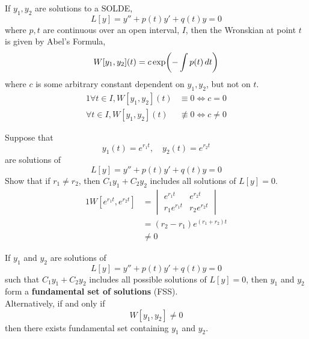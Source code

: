 \documentclass[diffeq.tex]{subfiles}
\begin{document}
    \begin{btheorem}
        If $y_{1}, y_{2}$ are solutions to a SOLDE,
        \begin{equation}
            L[y] = y'' + p(t)y' + q(t)y = 0
        \end{equation}
        where $p, t$ are continuous over an open interval, $I$, then the Wronskian at point $t$ is given by Abel's Formula,
        \begin{equation}
            W[y_{1}, y_{2}](t) = c\exp\bbbp{-\int p(t)\,dt}
        \end{equation}
        where $c$ is some arbitrary constant dependent on $y_{1}, y_{2}$, but not on $t$.
        \begin{alignat}{1}
            \forall t\in I, W[y_{1}, y_{2}](t) &\equiv 0 \iff c = 0\\
            \forall t\in I, W[y_{1}, y_{2}](t) &\nequiv 0 \iff c \neq 0
        \end{alignat}
    \end{btheorem}
    \np
    \begin{example}
        Suppose that
        \begin{equation}
            y_{1}(t) = e^{r_{1}t},\quad y_{2}(t) = e^{r_{2}t}
        \end{equation}
        are solutions of
        \begin{equation}
            L[y] = y'' + p(t)y' + q(t)y = 0
        \end{equation}
        Show that if $r_{1} \neq r_{2}$, then $C_{1}y_{1} + C_{2}y_{2}$ includes all solutions of $L[y] = 0$.
        \begin{alignat}{1}
            W[e^{r_{1}t}, e^{r_{2}t}] &= \begin{vmatrix}
                e^{r_{1}t} & e^{r_{2}t}\\
                r_{1}e^{r_{1}t} & r_{2}e^{r_{2}t}
            \end{vmatrix}\\
            &= (r_{2} - r_{1})e^{(r_{1} + r_{2})t}\\
            &\neq 0
        \end{alignat}
    \end{example}
    \begin{definition}
        If $y_{1}$ and $y_{2}$ are solutions of
        \begin{equation}
            L[y] = y'' + p(t)y' + q(t)y = 0
        \end{equation}
        such that $C_{1}y_{1} + C_{2}y_{2}$ includes all possible solutions of $L[y] = 0$, then $y_{1}$ and $y_{2}$ form a \textbf{fundamental set of solutions} (FSS).\\
        Alternatively, if and only if
        \begin{equation}
            W[y_{1}, y_{2}] \neq 0
        \end{equation}
        then there exists fundamental set containing $y_{1}$ and $y_{2}$.
    \end{definition}
\end{document}
